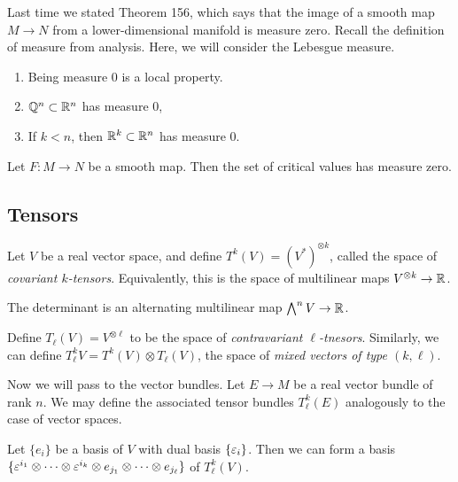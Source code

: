\documentclass[twoside, 10pt]{article}
\begin{document}
    Last time we stated Theorem 156, which says that the image of a smooth map $M \to N$ from a lower-dimensional manifold is measure zero. Recall the definition of measure from analysis. Here, we will consider the Lebesgue measure.

    \begin{rmk}
        \begin{enumerate}
            \item Being measure $0$ is a local property.
            \item $\mathbb{Q}^n \subset \mathbb{R}^n$ has measure $0$,
            \item If $k < n$, then $\mathbb{R}^k \subset \mathbb{R}^n$ has measure $0$.
        \end{enumerate}
    \end{rmk}

    \begin{thm}[Sard]
        Let $F:M \to N$ be a smooth map. Then the set of critical values has measure zero.
    \end{thm}

    \subsection{Tensors}%
    \label{sub:tensors}
    
    Let $V$ be a real vector space, and define $T^k(V) = (V^*)^{\otimes k}$, called the space of \textit{covariant $k$-tensors}. Equivalently, this is the space of multilinear maps $V^{\otimes k} \to \mathbb{R}$.

    \begin{exm}
        The determinant is an alternating multilinear map $\bigwedge^n V \to \mathbb{R}$.
    \end{exm}

    Define $T_{\ell}(V) = V^{\otimes \ell}$ to be the space of \textit{contravariant $\ell$-tnesors}. Similarly, we can define $T_{\ell}^k V = T^k(V) \otimes T_{\ell}(V)$, the space of \textit{mixed vectors of type $(k,\ell)$}.

    Now we will pass to the vector bundles. Let $E \to M$ be a real vector bundle of rank $n$. We may define the associated tensor bundles $T_{\ell}^k(E)$ analogously to the case of vector spaces.

    Let $\{e_i\}$ be a basis of $V$ with dual basis $\{ \varepsilon_i \}$. Then we can form a basis $\{ \varepsilon^{i_1} \otimes \cdots \otimes \varepsilon^{i_k} \otimes e_{j_1} \otimes \cdots \otimes e_{j_{\ell}} \}$ of $T_{\ell}^k(V)$. 
\end{document}
